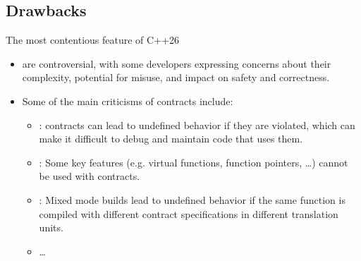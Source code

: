 \subsection{Drawbacks}

\begin{frame}[t,fragile]{The most contentious feature of C++26}
  \begin{itemize}

    \item {} are controversial, with some developers expressing concerns about their complexity, potential for misuse, and impact on safety and correctness.
    
    \item Some of the main criticisms of contracts include:
      \begin{itemize}

        \item {}: contracts can lead to undefined behavior if they are violated, which can make it difficult to debug and maintain code that uses them.
        
        \item {}: Some key features (e.g. virtual functions, function pointers, \ldots) cannot be used with contracts.
        
        \item {}: Mixed mode builds lead to undefined behavior if the same function is compiled with different contract specifications in different translation units.
        
        \item \ldots

      \end{itemize}

  \end{itemize}
\end{frame}